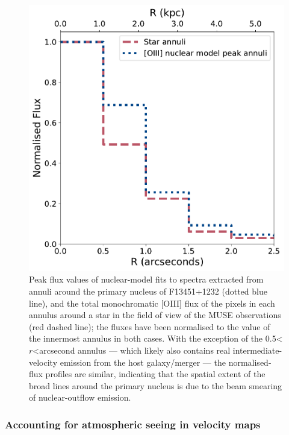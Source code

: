 \begin{figure}[!h]
    \vspace*{0.8cm}
    \centering
    \includegraphics[width=0.7\linewidth]{figures/muse_f13451_1232/star_outflow_annuli.pdf}
    \caption[Normalized fluxes in concentric apertures taken from \textbf{1)} the peak flux of the {[}OIII{]} nuclear model fits around the primary nucleus of F13451+1232 and \textbf{2)} the {[}OIII{]} flux of a star in the FOV of the MUSE DEEP dataset.]{Peak flux values of nuclear-model fits to spectra extracted from annuli around the primary nucleus of F13451+1232 (dotted blue line), and the total monochromatic [OIII] flux of the pixels in each annulus around a star in the field of view of the MUSE observations (red dashed line); the fluxes have been normalised to the value of the innermost annulus in both cases. With the exception of the 0.5\;\textless\;$r$\;\textless{}\;arcsecond annulus --- which likely also contains real intermediate-velocity emission from the host galaxy/merger --- the normalised-flux profiles are similar, indicating that the spatial extent of the broad lines around the primary nucleus is due to the beam smearing of nuclear-outflow emission.}
    \label{fig: muse_f13451_1232: analysis_and_results: seeing: star_outflow_annuli}
\end{figure}

\subsubsection{Accounting for atmospheric seeing in velocity maps}
\label{section: muse_f13451_1232: analysis_and_results: seeing: velocity_maps}


